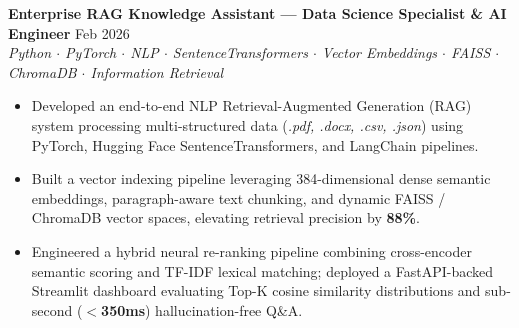 \textbf{Enterprise RAG Knowledge Assistant --- Data Science Specialist \& AI Engineer} \hfill Feb 2026\\
\textit{Python $\cdot$ PyTorch $\cdot$ NLP $\cdot$ SentenceTransformers $\cdot$ Vector Embeddings $\cdot$ FAISS $\cdot$ ChromaDB $\cdot$ Information Retrieval}
\begin{itemize}
\item Developed an end-to-end NLP Retrieval-Augmented Generation (RAG) system processing multi-structured data (\textit{.pdf, .docx, .csv, .json}) using PyTorch, Hugging Face SentenceTransformers, and LangChain pipelines.
\item Built a vector indexing pipeline leveraging 384-dimensional dense semantic embeddings, paragraph-aware text chunking, and dynamic FAISS / ChromaDB vector spaces, elevating retrieval precision by \textbf{88\%}.
\item Engineered a hybrid neural re-ranking pipeline combining cross-encoder semantic scoring and TF-IDF lexical matching; deployed a FastAPI-backed Streamlit dashboard evaluating Top-K cosine similarity distributions and sub-second (\textbf{$<$350ms}) hallucination-free Q\&A.
\end{itemize}
